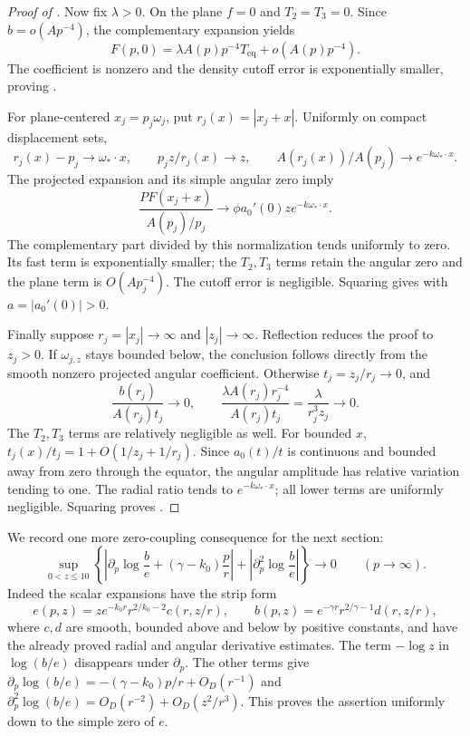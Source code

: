 \begin{proof}[Proof of ]
Now fix \(\lambda>0\).  On the plane \(f=0\) and \(T_2=T_3=0\).
Since \(b=o(Ap^{-4})\), the complementary expansion yields
\[
 F(p,0)=\lambda A(p)p^{-4}T_{\mathrm{eq}}+o(A(p)p^{-4}).
 \]
The coefficient is nonzero and the density cutoff error is
exponentially smaller, proving .

For plane-centered \(x_j=p_j\omega_j\), put \(r_j(x)=|x_j+x|\).
Uniformly on compact displacement sets,
\[
 r_j(x)-p_j\to\omega_*\cdot x,\qquad
 p_jz/r_j(x)\to z,\qquad
 A(r_j(x))/A(p_j)\to e^{-k\omega_*\cdot x}.
 \]
The projected expansion and its simple angular zero imply
\[
 \frac{PF(x_j+x)}{A(p_j)/p_j}
 \longrightarrow\phi a_0'(0)z e^{-k\omega_*\cdot x}.
 \]
The complementary part divided by this normalization tends
uniformly to zero.  Its fast term is exponentially smaller;
the \(T_2,T_3\) terms retain the angular zero and the plane
term is \(O(Ap_j^{-4})\).
The cutoff error is negligible.  Squaring gives
 with \(a=|a_0'(0)|>0\).

Finally suppose \(r_j=|x_j|\to\infty\) and \(|z_j|\to\infty\).
Reflection reduces the proof to \(z_j>0\).
If \(\omega_{j,z}\) stays bounded below, the conclusion follows
directly from the smooth nonzero projected angular coefficient.
Otherwise \(t_j=z_j/r_j\to0\), and
\[
 \frac{b(r_j)}{A(r_j)t_j}\to0,\qquad
 \frac{\lambda A(r_j)r_j^{-4}}{A(r_j)t_j}
       =\frac{\lambda}{r_j^3z_j}\to0.
 \]
The \(T_2,T_3\) terms are relatively negligible as well.
For bounded \(x\), \(t_j(x)/t_j=1+O(1/z_j+1/r_j)\).
Since \(a_0(t)/t\) is continuous and bounded away from zero
through the equator, the angular amplitude has relative
variation tending to one.  The radial ratio tends to
\(e^{-k\omega_*\cdot x}\); all lower terms are uniformly
negligible.  Squaring proves .
\end{proof}

We record one more zero-coupling consequence for the next section:
\begin{equation}
 \sup_{0<z\leq10}
 \left\{
 \left|\partial_p\log\frac be+(\gamma-k_0)\frac p r\right|
 +\left|\partial_p^2\log\frac be\right|
 \right\}\longrightarrow0\qquad(p\to\infty).
 \label{eq:unperturbed-strip-ratio}
\end{equation}
Indeed the scalar expansions have the strip form
\[
 e(p,z)=z e^{-k_0r}r^{2/k_0-2}c(r,z/r),\qquad
 b(p,z)=e^{-\gamma r}r^{2/\gamma-1}d(r,z/r),
 \]
where \(c,d\) are smooth, bounded above and below by positive
constants, and have the already proved radial and angular
derivative estimates.  The term \(-\log z\) in \(\log(b/e)\)
disappears under \(\partial_p\).  The other terms give
\(\partial_p\log(b/e)=-(\gamma-k_0)p/r+O_D(r^{-1})\) and
\(\partial_p^2\log(b/e)=O_D(r^{-2})+O_D(z^2/r^3)\).
This proves the assertion uniformly down to the simple zero of \(e\).

